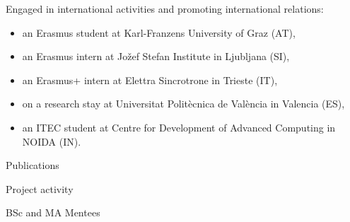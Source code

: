 \begin{frame}{\insertsection}
    Engaged in international activities and promoting international relations:
    \begin{itemize}
        \item an Erasmus student at \alert{Karl-Franzens University of Graz} (AT),
        \item an Erasmus intern at \alert{Jožef Stefan Institute in Ljubljana} (SI), 
        \item an Erasmus+ intern at \alert{Elettra Sincrotrone in Trieste} (IT), 
        \item on a research stay at \alert{Universitat Politècnica de València in Valencia} (ES),
        \item an ITEC student at \alert{Centre for Development of Advanced Computing in NOIDA} (IN).
    \end{itemize}
\end{frame}

\begin{frame}{\insertsection}
    \centering
    \begin{multicols}{3}
        Publications


        \columnbreak
        
        Project activity


        \columnbreak
        
        BSc and MA Mentees

    \end{multicols}
\end{frame}